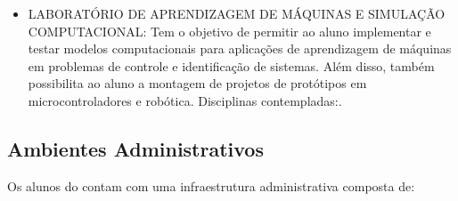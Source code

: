\documentclass{paper}
\begin{document}
\begin{itemize}
\item [LAMSC] LABORATÓRIO DE APRENDIZAGEM DE MÁQUINAS E SIMULAÇÃO COMPUTACIONAL: Tem o objetivo de permitir ao aluno implementar e testar modelos computacionais para aplicações de aprendizagem de máquinas em problemas de controle e identificação de sistemas. Além disso, também possibilita ao aluno a montagem de projetos de protótipos em microcontroladores e robótica.
    Disciplinas contempladas:\LAMSCdisc.


%
%

\end{itemize}

\subsection{Ambientes Administrativos}

Os alunos do \NOMECURSO contam com uma infraestrutura administrativa composta de: %
\end{document}
